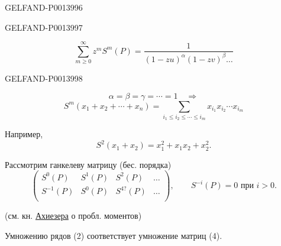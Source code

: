 \begin{GelfandAdjacentEvidence}{GELFAND-P001399}{6}

\end{GelfandAdjacentEvidence}
\begin{GelfandAdjacentEvidence}{GELFAND-P001399}{7}

\begin{equation*}
\sum_{m\ge 0}^{\infty}z^m S^m(P)
=\frac{1}{(1-zu)^\alpha(1-zv)^\beta\ldots} \tag{2}
\end{equation*}
\end{GelfandAdjacentEvidence}
\begin{GelfandAdjacentEvidence}{GELFAND-P001399}{8}


\[
\alpha=\beta=\gamma=\cdots=1\quad\Rightarrow
\]
\begin{equation*}
S^m(x_1+x_2+\cdots+x_n)
=\sum_{i_1\le i_2\le\cdots\le i_m}x_{i_1}x_{i_2}\cdots x_{i_m} \tag{3}
\end{equation*}

Например,
\[
S^2(x_1+x_2)=x_1^2+x_1x_2+x_2^2.
\]

Рассмотрим ганкелеву матрицу (бес. порядка)
\begin{equation*}
\begin{pmatrix}
S^0(P)&S^1(P)&S^2(P)&\ldots\\
S^{-1}(P)&S^0(P)&S^{4?}(P)&\ldots\\
&&&
\end{pmatrix},\qquad S^{-i}(P)=0\text{ при }i>0. \tag{4}
\end{equation*}
\end{GelfandAdjacentEvidence}


(см. кн. \uline{Ахиезера} о пробл. моментов)

Умножению рядов (2) соответствует умножение матриц (4).


